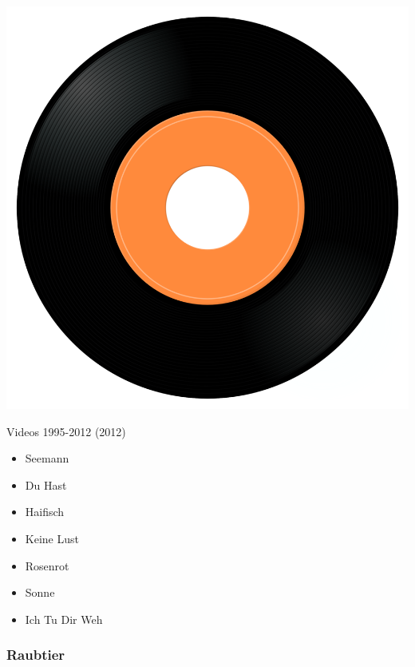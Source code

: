 \begin{minipage}[t]{0.25\textwidth}
\captionsetup{type=figure}
\includegraphics[width=\textwidth]{Images/cover.png}
\caption*{Videos 1995-2012 (2012)}
\end{minipage}
\begin{minipage}[t]{0.25\textwidth}\vspace{0pt}
\begin{itemize}[nosep,leftmargin=1em,labelwidth=*,align=left]
	\setlength{\itemsep}{0pt}
	\item Seemann
	\item Du Hast
	\item Haifisch
	\item Keine Lust
	\item Rosenrot
	\item Sonne
	\item Ich Tu Dir Weh
\end{itemize}
\end{minipage}

\subsubsection{Raubtier}

